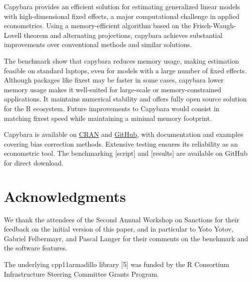 \documentclass[
  10pt,
  letterpaper,
]{article}
\begin{document}
Capybara provides an efficient solution for estimating generalized
linear models with high-dimensional fixed effects, a major computational
challenge in applied econometrics. Using a memory-efficient algorithm
based on the Frisch-Waugh-Lovell theorem and alternating projections,
capybara achieves substantial improvements over conventional methods and
similar solutions.

The benchmark show that capybara reduces memory usage, making estimation
feasible on standard laptops, even for models with a large number of
fixed effects. Although packages like fixest may be faster in some
cases, capybara lower memory usage makes it well-suited for large-scale
or memory-constrained applications. It maintains numerical stability and
offers fully open source solution for the R ecosystem. Future
improvements to Capybara would consist in matching fixest speed while
maintaining a minimal memory footprint.

Capybara is available on
\href{https://cran.r-project.org/package=capybara}{CRAN} and
\href{https://github.com/pachadotdev/capybara}{GitHub}, with
documentation and examples covering bias correction methods. Extensive
testing ensures its reliability as an econometric tool. The benchmarking
{[}script{]} and {[}results{]} are available on GitHub for direct
download.

\section{Acknowledgments}\label{acknowledgments}

We thank the attendees of the Second Annual Workshop on Sanctions for
their feedback on the initial version of this paper, and in particular
to Yoto Yotov, Gabriel Felbermayr, and Pascal Langer for their comments
on the benchmark and the software features.

The underlying cpp11armadillo library {[}5{]} was funded by the R
Consortium Infrastructure Steering Committee Grants Program.
\end{document}
